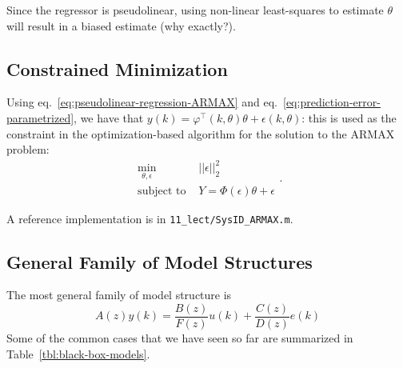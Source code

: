 Since the regressor is pseudolinear, using non-linear least-squares to estimate $\theta$ will result in a biased estimate (why exactly?).

\subsection{Constrained Minimization}
\label{sec:ARMAX-minimization}

Using eq.~\eqref{eq:pseudolinear-regression-ARMAX} and eq.~\eqref{eq:prediction-error-parametrized}, we have that $y(k) = \varphi^\top(k,\theta) \theta + \epsilon(k,\theta)$: this is used as the constraint in the optimization-based algorithm for the solution to the ARMAX problem:
\begin{equation*}
  \begin{aligned}
    \min_{\theta,\epsilon}\ & ||\epsilon||_2^2 \\
    \textrm{subject to } & Y = \Phi(\epsilon)\theta + \epsilon
  \end{aligned}.
\end{equation*}

A reference implementation is in \texttt{11\_lect/SysID\_ARMAX.m}.

\subsection{General Family of Model Structures}
\label{sec:general-family-models}

The most general family of model structure is~\cite[Sect.~4]{ljung}
\begin{equation}
  \label{eq:general-family-models}
  A(z)y(k) = \frac{B(z)}{F(z)}u(k) + \frac{C(z)}{D(z)}e(k)
\end{equation}
Some of the common cases that we have seen so far are summarized in Table~\ref{tbl:black-box-models}.

